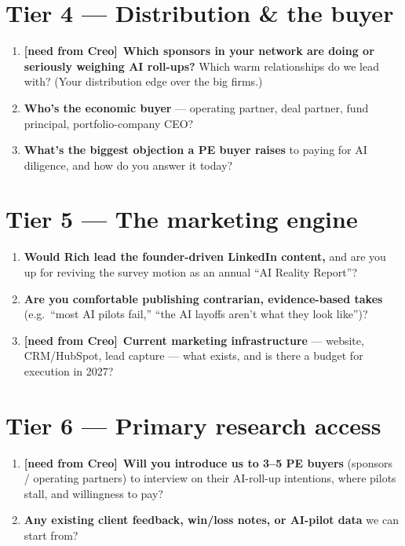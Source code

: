 \documentclass[11pt]{article}
\newcommand{\gap}{\textcolor{orange!85!black}{\textbf{[need from Creo]}}~}
\begin{document}
\section{Tier 4 --- Distribution \& the buyer}
\begin{enumerate}[resume]
  \item \gap\textbf{Which sponsors in your network are doing or seriously weighing AI roll-ups?}
  Which warm relationships do we lead with? (Your distribution edge over the big firms.)
  \item \textbf{Who's the economic buyer} --- operating partner, deal partner, fund principal,
  portfolio-company CEO?
  \item \textbf{What's the biggest objection a PE buyer raises} to paying for AI diligence, and
  how do you answer it today?
\end{enumerate}

\section{Tier 5 --- The marketing engine}
\begin{enumerate}[resume]
  \item \textbf{Would Rich lead the founder-driven LinkedIn content,} and are you up for
  reviving the survey motion as an annual ``AI Reality Report''?
  \item \textbf{Are you comfortable publishing contrarian, evidence-based takes} (e.g.\ ``most AI
  pilots fail,'' ``the AI layoffs aren't what they look like'')?
  \item \gap\textbf{Current marketing infrastructure} --- website, CRM/HubSpot, lead capture ---
  what exists, and is there a budget for execution in 2027?
\end{enumerate}

\section{Tier 6 --- Primary research access}
\begin{enumerate}[resume]
  \item \gap\textbf{Will you introduce us to 3--5 PE buyers} (sponsors / operating partners) to
  interview on their AI-roll-up intentions, where pilots stall, and willingness to pay?
  \item \textbf{Any existing client feedback, win/loss notes, or AI-pilot data} we can start from?
\end{enumerate}
\end{document}

